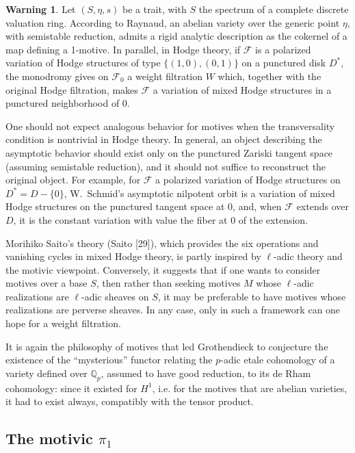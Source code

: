 \documentclass[11pt,a4paper]{article}
\theoremstyle{plain}
\theoremstyle{definition}
\newtheorem{remark}[theorem]{Warning}
\newcommand{\Q}{\mathbb{Q}}
\begin{document}
\begin{remark}
Let $(S,\eta,s)$ be a trait, with $S$ the spectrum of a complete discrete valuation ring. According to Raynaud, an abelian variety over the generic point $\eta$, with semistable reduction, admits a rigid analytic description as the cokernel of a map defining a 1-motive. In parallel, in Hodge theory, if $\mathscr{F}$ is a polarized variation of Hodge structures of type $\{(1,0),(0,1)\}$ on a punctured disk $D^*$, the monodromy gives on $\mathscr{F}_0$ a weight filtration $W$ which, together with the original Hodge filtration, makes $\mathscr{F}$ a variation of mixed Hodge structures in a punctured neighborhood of $0$.

One should not expect analogous behavior for motives when the transversality condition is nontrivial in Hodge theory. In general, an object describing the asymptotic behavior should exist only on the punctured Zariski tangent space (assuming semistable reduction), and it should not suffice to reconstruct the original object. For example, for $\mathscr{F}$ a polarized variation of Hodge structures on $D^*=D-\{0\}$, W.~Schmid's asymptotic nilpotent orbit is a variation of mixed Hodge structures on the punctured tangent space at $0$, and, when $\mathscr{F}$ extends over $D$, it is the constant variation with value the fiber at $0$ of the extension.

Morihiko Saito's theory (Saito [29]), which provides the six operations and vanishing cycles in mixed Hodge theory, is partly inspired by $\ell$-adic theory and the motivic viewpoint. Conversely, it suggests that if one wants to consider motives over a base $S$, then rather than seeking motives $M$ whose $\ell$-adic realizations are $\ell$-adic sheaves on $S$, it may be preferable to have motives whose realizations are perverse sheaves. In any case, only in such a framework can one hope for a weight filtration.
\end{remark}

It is again the philosophy of motives that led Grothendieck to conjecture the existence of the ``mysterious'' functor relating the $p$-adic etale cohomology of a variety defined over $\Q_p$, assumed to have good reduction, to its de Rham cohomology: since it existed for $H^1$, i.e. for the motives that are abelian varieties, it had to exist always, compatibly with the tensor product.

\subsection{The motivic $\pi_1$}
\end{document}
